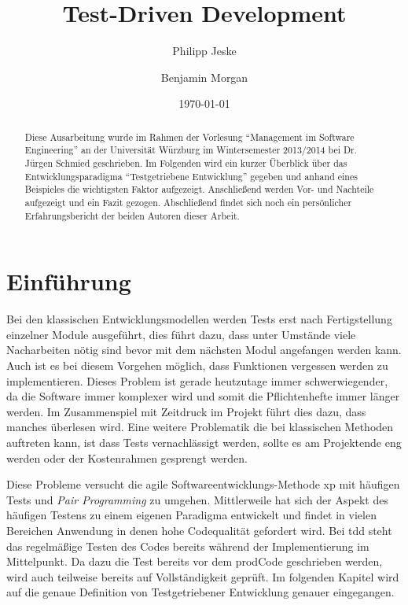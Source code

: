 \documentclass{mitschrift}
\title{Test-Driven Development}
\author{Philipp Jeske \and Benjamin Morgan}
\date{\today}
\newcommand{\pje}{\marginpar{Philipp\\Jeske}}
\begin{document}
\maketitle

\tableofcontents

\begin{abstract}
 Diese Ausarbeitung wurde im Rahmen der Vorlesung "`Management im Software
 Engineering"' an der Universität Würzburg im Wintersemester 2013/2014 bei Dr.
 Jürgen Schmied geschrieben. Im Folgenden wird ein kurzer Überblick über das
 Entwicklungsparadigma "`Testgetriebene Entwicklung"' gegeben und anhand eines
 Beispieles die wichtigsten Faktor aufgezeigt. Anschließend werden Vor- und
 Nachteile aufgezeigt und ein Fazit gezogen. Abschließend findet sich noch ein
 persönlicher Erfahrungsbericht der beiden Autoren dieser Arbeit.
\end{abstract}

\chapter{Einführung}\label{Einfuehrung}\pje
Bei den klassischen Entwicklungsmodellen werden Tests erst nach Fertigstellung
einzelner Module ausgeführt, dies führt dazu, dass unter Umstände viele
Nacharbeiten nötig sind bevor mit dem nächsten Modul angefangen werden kann.
Auch ist es bei diesem Vorgehen möglich, dass Funktionen vergessen werden zu
implementieren. Dieses Problem ist gerade heutzutage immer schwerwiegender, da
die Software immer komplexer wird und somit die Pflichtenhefte immer länger
werden. Im Zusammenspiel mit Zeitdruck im Projekt führt dies dazu, dass manches
überlesen wird. Eine weitere Problematik die bei klassischen Methoden
auftreten kann, ist dass Tests vernachlässigt werden, sollte es am Projektende
eng werden oder der Kostenrahmen gesprengt werden.

Diese Probleme versucht die agile Softwareentwicklungs-Methode \gls{xp} mit
häufigen Tests und \emph{Pair Programming} zu umgehen. Mittlerweile hat sich der
Aspekt des häufigen Testens zu einem eigenen Paradigma entwickelt und findet in
vielen Bereichen Anwendung in denen hohe Codequalität gefordert wird. Bei
\gls{tdd} steht das regelmäßige Testen des Codes bereits während der
Implementierung im Mittelpunkt. Da dazu die Test bereits vor dem \gls{prodCode}
geschrieben werden, wird auch teilweise bereits auf Vollständigkeit geprüft. Im
folgenden Kapitel wird auf die genaue Definition von Testgetriebener
Entwicklung genauer eingegangen.
\end{document}
